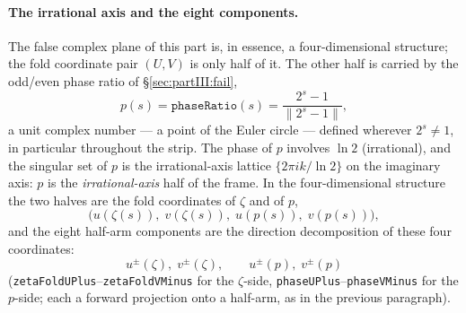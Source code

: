 \documentclass{article}
\newcommand{\zt}{\zeta}
\begin{document}
\paragraph{The irrational axis and the eight components.}
The false complex plane of this part is, in essence, a
four-dimensional structure; the fold coordinate pair $(U,V)$ is only
half of it. The other half is carried by the odd/even phase ratio of
\S\ref{sec:partIII:fail},
\begin{equation}
  p(s)=\texttt{phaseRatio}(s)=\frac{2^s-1}{\|2^s-1\|},
\end{equation}
a unit complex number --- a point of the Euler circle --- defined
wherever $2^s\ne1$, in particular throughout the strip. The phase of
$p$ involves $\ln 2$ (irrational), and the singular set of $p$ is the
irrational-axis lattice $\{2\pi i k/\ln 2\}$ on the imaginary axis:
$p$ is the \emph{irrational-axis} half of the frame. In the
four-dimensional structure the two halves are the fold coordinates of
$\zt$ and of $p$,
\begin{equation}
  \bigl(u(\zt(s)),\;v(\zt(s)),\;u(p(s)),\;v(p(s))\bigr),
\end{equation}
and the eight half-arm components are the direction decomposition of
these four coordinates:
\begin{equation}
  u^\pm(\zt),\;v^\pm(\zt),\qquad u^\pm(p),\;v^\pm(p)
\end{equation}
(\texttt{zetaFoldUPlus}--\texttt{zetaFoldVMinus} for the $\zt$-side,
\texttt{phaseUPlus}--\texttt{phaseVMinus} for the $p$-side; each a
forward projection onto a half-arm, as in the previous paragraph).
\end{document}
